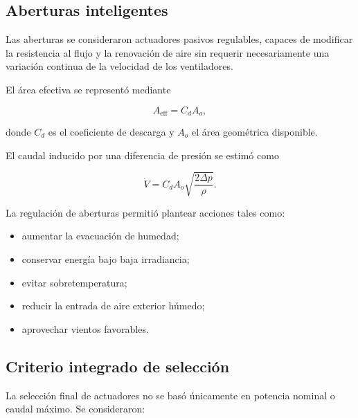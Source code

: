 \subsection{Aberturas inteligentes}
\label{subsec:aberturas_inteligentes}

Las aberturas se consideraron actuadores pasivos regulables, capaces de modificar la resistencia al flujo y la renovación de aire sin requerir necesariamente una variación continua de la velocidad de los ventiladores.

El área efectiva se representó mediante

\begin{equation}
A_{\mathrm{eff}}
=
C_d A_o,
\label{eq:area_efectiva_abertura}
\end{equation}

donde $C_d$ es el coeficiente de descarga y $A_o$ el área geométrica disponible.

El caudal inducido por una diferencia de presión se estimó como

\begin{equation}
\dot V
=
C_d A_o
\sqrt{
\frac{2\Delta p}{\rho}
}.
\label{eq:caudal_abertura}
\end{equation}

La regulación de aberturas permitió plantear acciones tales como:

\begin{itemize}
    \item aumentar la evacuación de humedad;
    \item conservar energía bajo baja irradiancia;
    \item evitar sobretemperatura;
    \item reducir la entrada de aire exterior húmedo;
    \item aprovechar vientos favorables.
\end{itemize}

\subsection{Criterio integrado de selección}
\label{subsec:criterio_integrado_actuadores}

La selección final de actuadores no se basó únicamente en potencia nominal o caudal máximo. Se consideraron:

